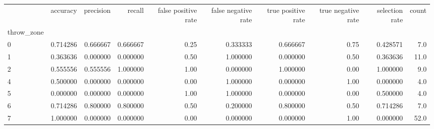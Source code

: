 \begin{tabular}{lrrrrrrrrr}
\toprule
{} &  accuracy &  precision &    recall &  false positive rate &  false negative rate &  true positive rate &  true negative rate &  selection rate &  count \\
throw\_zone &           &            &           &                      &                      &                     &                     &                 &        \\
\midrule
0          &  0.714286 &   0.666667 &  0.666667 &                 0.25 &             0.333333 &            0.666667 &                0.75 &        0.428571 &    7.0 \\
1          &  0.363636 &   0.000000 &  0.000000 &                 0.50 &             1.000000 &            0.000000 &                0.50 &        0.363636 &   11.0 \\
2          &  0.555556 &   0.555556 &  1.000000 &                 1.00 &             0.000000 &            1.000000 &                0.00 &        1.000000 &    9.0 \\
4          &  0.500000 &   0.000000 &  0.000000 &                 0.00 &             1.000000 &            0.000000 &                1.00 &        0.000000 &    4.0 \\
5          &  0.000000 &   0.000000 &  0.000000 &                 1.00 &             1.000000 &            0.000000 &                0.00 &        0.500000 &    4.0 \\
6          &  0.714286 &   0.800000 &  0.800000 &                 0.50 &             0.200000 &            0.800000 &                0.50 &        0.714286 &    7.0 \\
7          &  1.000000 &   0.000000 &  0.000000 &                 0.00 &             0.000000 &            0.000000 &                1.00 &        0.000000 &   52.0 \\
\bottomrule
\end{tabular}
